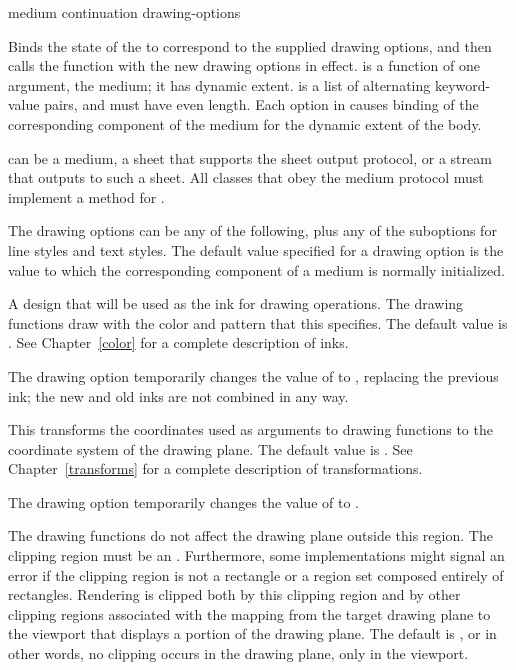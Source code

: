  {medium continuation \rest drawing-options}

Binds the state of the   to correspond to the supplied
drawing options, and then calls the function  with the new
drawing options in effect.   is a function of one argument,
the medium; it has dynamic extent.   is a list of
alternating keyword-value pairs, and must have even length.  Each option in
 causes binding of the corresponding component of the
medium for the dynamic extent of the body.

 can be a medium, a sheet that supports the sheet output protocol,
or a stream that outputs to such a sheet.  All classes that obey the medium
protocol must implement a method for .

The drawing options can be any of the following, plus any of the suboptions for
line styles and text styles.  The default value specified for a drawing option
is the value to which the corresponding component of a medium is normally
initialized.


A design that will be used as the ink for drawing operations.  The drawing
functions draw with the color and pattern that this specifies.  The default
value is .  See Chapter~\ref{color} for a complete
description of inks.

The   drawing option temporarily changes the value of
 to , replacing the previous ink; the
new and old inks are not combined in any way.



This transforms the coordinates used as arguments to drawing functions to the
coordinate system of the drawing plane.  The default value is
.  See Chapter~\ref{transforms} for a complete
description of transformations.

The   drawing option temporarily changes the
value of to
.



The drawing functions do not affect the drawing plane outside this region.  The
clipping region must be an .  Furthermore, some implementations might
signal an error if the clipping region is not a rectangle or a region set
composed entirely of rectangles.  Rendering is clipped both by this clipping
region and by other clipping regions associated with the mapping from the target
drawing plane to the viewport that displays a portion of the drawing plane.  The
default is , or in other words, no clipping occurs in the
drawing plane, only in the viewport.

